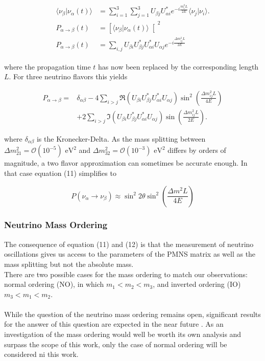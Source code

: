 \documentclass[a4paper,12pt,numbered]{article}
\begin{document}
\begin{align}
\begin{split}
\langle \nu_\beta | \nu_\alpha (t) \rangle &= \sum_{i=1}^3 \sum_{j=1}^3 U_{\beta j} U_{\alpha i}^* e^{-i \frac{m_i^2 L}{2E}} \langle \nu_j | \nu_i \rangle.
\\
P_{\alpha \to \beta}(t) &= \left[ \langle \nu_\beta | \nu_\alpha (t) \rangle \right[^2
\\
P_{\alpha \to \beta}(t) &= \sum_{i,j} U_{\beta i} U_{\beta j}^* U_{\alpha i}^* U_{\alpha j} e^{-i \frac{\Delta m_{ij}^2 L}{2E}}
\end{split}
\end{align}

where the propagation time $t$ has now been replaced by the corresponding length $L$.
For three neutrino flavors this yields

\begin{align}
P_{\alpha \to \beta} = & \delta_{\alpha\beta} - 4 \sum_{i > j} \Re\left( U_{\beta i} U_{\beta j}^* U_{\alpha i}^* U_{\alpha j} \right) \sin^2\left( \frac{\Delta m_{ij}^2 L}{4E} \right) \nonumber \\
& + 2 \sum_{i > j} \Im\left( U_{\beta i} U_{\beta j}^* U_{\alpha i}^* U_{\alpha j} \right) \sin\left( \frac{\Delta m_{ij}^2 L}{2E} \right).
\end{align}

where $\delta_{\alpha\beta}$ is the Kronecker-Delta. As the mass splitting between $\Delta m_{21}^2=\mathcal{O}(10^{-5}) \text{ eV}^2$ and $\Delta m_{32}^2=\mathcal{O}(10^{-3}) \text{ eV}^2$ differs by orders of magnitude, a two flavor approximation can sometimes be accurate enough. In that case equation (11) simplifies to

\begin{equation}
P(\nu_\alpha \to \nu_\beta) \approx \sin^2 2\theta \sin^2 \left(\frac{\Delta m^2 L}{4E}\right)
\end{equation}


\subsubsection{Neutrino Mass Ordering}

The consequence of equation (11) and (12) is that the measurement of neutrino oscillations gives us access to the parameters of the PMNS matrix as well as the mass splitting but not the absolute mass.
\\ 
There are two possible cases for the mass ordering to match our observations: normal ordering (NO), in which $m_1 < m_2 < m_3$, and inverted ordering (IO) $m_3 < m_1 < m_2$. 
\\ \\
While the question of the neutrino mass ordering remains open, significant results for the answer of this question are expected in the near future \cite{future_nmo_sensitivity}. As an investigation of the mass ordering would well be worth its own analysis and surpass the scope of this work, only the case of normal ordering will be considered ni this work.
\end{document}
